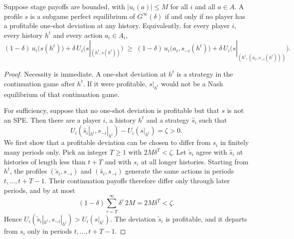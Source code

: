 \begin{proposition}\label{prop:12-osdp}
Suppose stage payoffs are bounded, with $|u_i(a)| \le M$ for all $i$ and all $a \in A$. A profile $s$ is a subgame
perfect equilibrium of $G^\infty(\delta)$ if and only if no player has a profitable one-shot deviation at any history.
Equivalently, for every player $i$, every history $h^t$ and every action $a_i \in A_i$,
\begin{equation}\label{eq:12-osdp}
(1 - \delta)\,u_i\bigl(s(h^t)\bigr) + \delta\,U_i\bigl(s|_{(h^t, s(h^t))}\bigr)
\;\ge\;
(1 - \delta)\,u_i\bigl(a_i, s_{-i}(h^t)\bigr) + \delta\,U_i\bigl(s|_{(h^t, (a_i, s_{-i}(h^t)))}\bigr).
\end{equation}
\end{proposition}

\begin{proof}
Necessity is immediate. A one-shot deviation at $h^t$ is a strategy in the continuation game after $h^t$. If it were
profitable, $s|_{h^t}$ would not be a Nash equilibrium of that continuation game.

For sufficiency, suppose that no one-shot deviation is profitable but that $s$ is not an SPE. Then there are a player
$i$, a history $h^t$ and a strategy $\hat s_i$ such that
\begin{equation*}
U_i(\hat s_i|_{h^t}, s_{-i}|_{h^t}) - U_i(s|_{h^t}) = \zeta > 0 .
\end{equation*}
We first show that a profitable deviation can be chosen to differ from $s_i$ in finitely many periods only. Pick an
integer $T \ge 1$ with $2M\delta^T < \zeta$. Let $\tilde s_i$ agree with $\hat s_i$ at histories of length less than
$t + T$ and with $s_i$ at all longer histories. Starting from $h^t$, the profiles $(\tilde s_i, s_{-i})$ and
$(\hat s_i, s_{-i})$ generate the same actions in periods $t, \dots, t + T - 1$. Their continuation payoffs therefore
differ only through later periods, and by at most
\begin{equation*}
(1 - \delta)\sum_{\tau = T}^{\infty}\delta^{\tau}\,2M = 2M\delta^T < \zeta .
\end{equation*}
Hence $U_i(\tilde s_i|_{h^t}, s_{-i}|_{h^t}) > U_i(s|_{h^t})$. The deviation $\tilde s_i$ is profitable, and it
departs from $s_i$ only in periods $t, \dots, t + T - 1$.


\end{proof}
